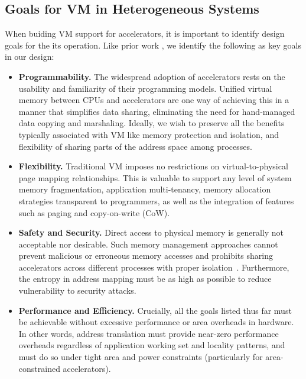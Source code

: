 \subsection{Goals for VM in Heterogeneous Systems}
When buiding VM support for accelerators, it is important to identify
design goals for the its operation. Like prior work
\cite{haria:devirtualizing}, we identify the following as key goals in
our design:

\begin{itemize}
        \item \textbf{Programmability.} The widespread adoption of
          accelerators rests on the usability and familiarity of their
          programming models. Unified virtual memory between CPUs and
          accelerators are one way of achieving this in a manner that
          simplifies data sharing, eliminating the need for
          hand-managed data copying and marshaling. Ideally, we wish
          to preserve all the benefits typically associated with VM
          like memory protection and isolation, and flexibility of
          sharing parts of the address space among processes.

        \item \textbf{Flexibility.} Traditional VM imposes no
          restrictions on virtual-to-physical page mapping
          relationships. This is valuable to support any level of
          system memory fragmentation, application multi-tenancy,
          memory allocation strategies transparent to programmers, as
          well as the integration of features such as paging and
          copy-on-write (CoW).

        \item \textbf{Safety and Security.} Direct access to physical
          memory is generally not acceptable nor desirable. Such
          memory management approaches cannot prevent malicious or
          erroneous memory accesses and prohibits sharing accelerators
          across different processes with proper
          isolation~\cite{haria:devirtualizing}. Furthermore, the
          entropy in address mapping must be as high as possible to
          reduce vulnerability to security attacks.

        \item \textbf{Performance and Efficiency.} Crucially, all the
          goals listed thus far must be achievable without excessive
          performance or area overheads in hardware. In other words,
          address translation must provide near-zero performance
          overheads regardless of application working set and locality
          patterns, and must do so under tight area and power
          constraints (particularly for area-constrained accelerators). 


\end{itemize}


